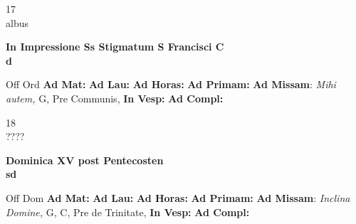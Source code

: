 \documentclass[10pt, openany]{book}
\begin{document}
    \begin{center}
        \begin{minipage}{3.5in}
            \vspace{2em}
            \begin{minipage}{0.5in}
                {\Huge 17} \\
                {\normalsize albus}
            \end{minipage}
            \begin{minipage}{3.0in}
                \textbf{ \large In Impressione Ss Stigmatum S Francisci C \\
                \textnormal{\normalsize d}}

            \end{minipage}
            \begin{justify}Off Ord
                \textbf{Ad Mat: }
                \textbf{Ad Lau: }
                \textbf{Ad Horas: }
                \textbf{Ad Primam: }\textbf{Ad Missam}: \textit{Mihi autem,} G, Pre Communis, 
                \textbf{In Vesp: }
                \textbf{Ad Compl: }
            \end{justify}
        \end{minipage}
    \end{center}

    \begin{center}
        \begin{minipage}{3.5in}
            \vspace{2em}
            \begin{minipage}{0.5in}
                {\Huge 18} \\
                {\normalsize ????}
            \end{minipage}
            \begin{minipage}{3.0in}
                \textbf{ \large Dominica XV post Pentecosten \\
                \textnormal{\normalsize sd}}

            \end{minipage}
            \begin{justify}Off Dom
                \textbf{Ad Mat: }
                \textbf{Ad Lau: }
                \textbf{Ad Horas: }
                \textbf{Ad Primam: }\textbf{Ad Missam}: \textit{Inclina Domine,} G, C, Pre de Trinitate, 
                \textbf{In Vesp: }
                \textbf{Ad Compl: }
            \end{justify}
        \end{minipage}
    \end{center}
\end{document}
